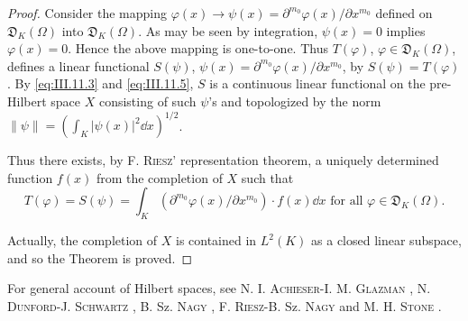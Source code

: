 \begin{proof}
Consider the mapping $\varphi(x) \to \psi(x) = \partial^{m_0} \varphi(x)/\partial x^{m_0}$ defined on $\mathfrak{D}_K(\Omega)$ into $\mathfrak{D}_K(\Omega)$. As may be seen by integration, $\psi(x) = 0$ implies $\varphi(x) = 0$. Hence the above mapping is one-to-one. Thus $T(\varphi)$, $\varphi \in \mathfrak{D}_K(\Omega)$, defines a linear functional $S(\psi)$, $\psi(x) = \partial^{m_0} \varphi(x)/\partial x^{m_0}$, by $S(\psi) = T(\varphi)$. By \eqref{eq:III.11.3} and \eqref{eq:III.11.5}, $S$ is a continuous linear functional on the pre-Hilbert space $X$ consisting of such $\psi$'s and topologized by the norm $\|\psi\| = \left( \int_K |\psi(x)|^2 \dd x \right)^{1/2}$. 

Thus there exists, by F. \textsc{Riesz}' representation theorem, a uniquely determined function $f(x)$ from the completion of $X$ such that 
\[
T (\varphi) = S (\psi) = \int_{K} \left(\partial^ {m _{0}} \varphi (x) / \partial x ^ {m _{0}}\right) \cdot f (x) \dd x \text{ for all } \varphi \in \mathfrak {D} _{K} (\Omega).
\]

Actually, the completion of $X$ is contained in $L^{2}(K)$ as a closed linear subspace, and so the Theorem is proved. 
\end{proof}


For general account of Hilbert spaces, see N. I. \textsc{Achieser}-I. M. \textsc{Glazman} \cite{achieser1}, N. \textsc{Dunford}-J. \textsc{Schwartz} \cite{dunford45}, B. Sz. \textsc{Nagy} \cite{nagy217}, F. \textsc{Riesz}-B. Sz. \textsc{Nagy} \cite{nagy219} and M. H. \textsc{Stone} \cite{stone311}. 
